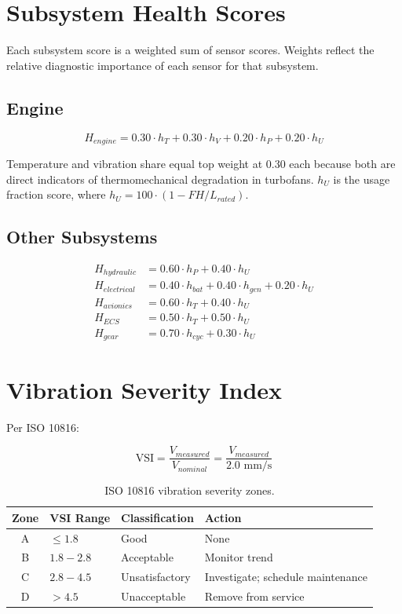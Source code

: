 \documentclass[11pt, a4paper]{report}
\begin{document}
\section{Subsystem Health Scores}

Each subsystem score is a weighted sum of sensor scores. Weights reflect the
relative diagnostic importance of each sensor for that subsystem.

\subsection{Engine}

\[
H_{engine} = 0.30 \cdot h_T + 0.30 \cdot h_V + 0.20 \cdot h_P + 0.20 \cdot h_U
\]

Temperature and vibration share equal top weight at 0.30 each because both
are direct indicators of thermomechanical degradation in turbofans.
$h_U$ is the usage fraction score, where $h_U = 100 \cdot (1 - FH/L_{rated})$.

\subsection{Other Subsystems}

\begin{align}
  H_{hydraulic}   &= 0.60 \cdot h_P + 0.40 \cdot h_U \\[4pt]
  H_{electrical}  &= 0.40 \cdot h_{bat} + 0.40 \cdot h_{gen} + 0.20 \cdot h_U \\[4pt]
  H_{avionics}    &= 0.60 \cdot h_T + 0.40 \cdot h_U \\[4pt]
  H_{ECS}         &= 0.50 \cdot h_T + 0.50 \cdot h_U \\[4pt]
  H_{gear}        &= 0.70 \cdot h_{cyc} + 0.30 \cdot h_U
\end{align}

\section{Vibration Severity Index}

Per ISO 10816:

\[
\text{VSI} = \frac{V_{measured}}{V_{nominal}} = \frac{V_{measured}}{2.0 \text{ mm/s}}
\]

\begin{table}[h!]
\centering
\begin{tabular}{@{}clll@{}}
\toprule
\textbf{Zone} & \textbf{VSI Range} & \textbf{Classification} & \textbf{Action} \\
\midrule
A & $\leq 1.8$   & Good                        & None \\
B & $1.8 - 2.8$  & Acceptable                  & Monitor trend \\
C & $2.8 - 4.5$  & Unsatisfactory              & Investigate; schedule maintenance \\
D & $> 4.5$      & Unacceptable                & Remove from service \\
\bottomrule
\end{tabular}
\caption{ISO 10816 vibration severity zones.}
\end{table}
\end{document}
